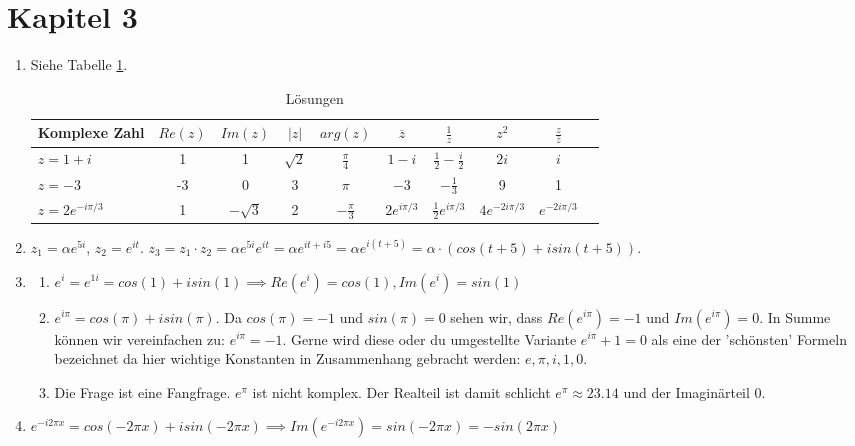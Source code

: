 \section{Kapitel 3}
\begin{enumerate}
\item Siehe Tabelle \ref{tab:sol_3_1}.

\renewcommand{\arraystretch}{1.5}

\begin{table}[H] 
\centering
\begin{tabular}{|>{\raggedright}m{3cm}|c|c|c|c|c|c|c|c|c|}
\hline
\textbf{Komplexe Zahl} & $Re(z)$ & $Im(z)$ & $|z|$ & $arg(z)$ & $\overline{z}$ & $\frac{1}{z}$ & $z^2$ & $\frac{z}{\overline{z}}$ \\
\hline
$z = 1 + i$ & 1 & 1 & $\sqrt{2}$ & $\frac{\pi}{4}$ & $1 - i$ & $\frac{1}{2} - \frac{i}{2}$ & $2i$ & $i$ \\
\hline
$z = -3$ & -3 & 0 & 3 & $\pi$ & $-3$ & $-\frac{1}{3}$ & 9 & 1 \\
\hline
$z = 2e^{-i\pi/3}$ & 1 & $-\sqrt{3}$ & 2 & $-\frac{\pi}{3}$ & $2e^{i\pi/3}$  & $\frac{1}{2}e^{i\pi/3}$ & $4e^{-2i\pi/3}$ & $e^{-2i\pi/3}$ \\
\hline
\end{tabular}
\caption{Lösungen}
\label{tab:sol_3_1}
\end{table}

\item $z_1 = \alpha e^{5i}$, 
$z_2 = e^{it}$. 
$z_3 = z_1 \cdot z_2 = \alpha e^{5i} e^{it} = \alpha e^{it + i5} = \alpha e^{i(t + 5)} = \alpha \cdot \left(cos(t+5) + i sin(t+5) \right)$.
\item 
\begin{enumerate}
\item $e^i = e^{1i} = cos(1) + i sin(1) \implies Re(e^i) = cos(1) ,Im(e^i) = sin(1)$
\item $e^{i\pi} = cos(\pi) + i sin(\pi)$. Da $cos(\pi) = -1$ und $sin(\pi) = 0$ sehen wir, dass $Re(e^{i\pi}) = -1$ und $Im(e^{i\pi}) = 0$. In Summe können wir vereinfachen zu: $e^{i\pi} = -1$. Gerne wird diese oder du umgestellte Variante $e^{i\pi} + 1 = 0$ als eine der 'schönsten' Formeln bezeichnet da hier wichtige Konstanten in Zusammenhang gebracht werden: $e, \pi, i, 1, 0$.  
\item Die Frage ist eine Fangfrage. $e^{\pi}$ ist nicht komplex. Der Realteil ist damit schlicht $e^{\pi} \approx 23.14$ und der Imaginärteil $0$.
\end{enumerate}
\item $e^{-i2\pi x} = cos(-2\pi x) + i sin(-2\pi x) \implies Im(e^{-i2\pi x}) = sin(-2\pi x) = -sin(2\pi x)$


\end{enumerate}
